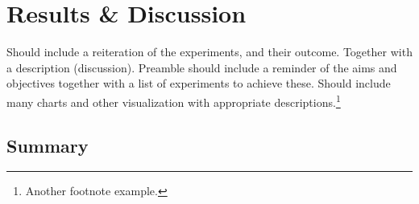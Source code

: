 \chapter{Results \& Discussion}
Should include a reiteration of the experiments, and their outcome.  Together with a description (discussion).  Preamble should include a reminder of the aims and objectives together with a list of experiments to achieve these.  Should include many charts and other visualization with appropriate descriptions.\footnote{Another footnote example.}  

\blindtext

\section{Summary}
\blindtext\enlargethispage{\baselineskip} %